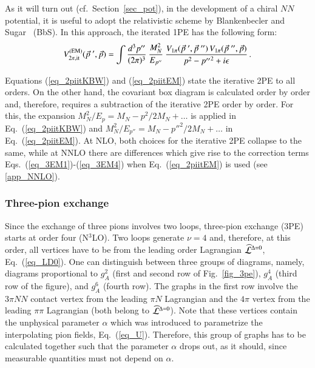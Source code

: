 \documentclass[sort&compress,preprint,3p]{elsarticle}
\begin{document}
As it will turn out (cf.\ Section~\ref{sec_pot}),
in the development of a chiral $NN$ potential,
it is useful
to adopt the relativistic scheme 
by Blankenbecler and Sugar~\cite{BS66} (BbS).
In this approach, the iterated 1PE
has the following form:
\begin{equation}
V_{2\pi, \rm it}^{\rm(EM)} ({\vec p}~',{\vec p})  = 
\int 
\frac{d^3p''}{(2\pi)^3} 
\:
\frac{M_N^2}{E_{p''}} 
\:
\frac{V_{1\pi}({\vec p}~',{\vec p}~'')\,
V_{1\pi}({\vec p}~'',{\vec p})} 
{{ p}^{2}-{p''}^{2}+i\epsilon}
\,.
\label{eq_2piitEM}
\end{equation}

Equations 
(\ref{eq_2piitKBW})
and (\ref{eq_2piitEM})
state the iterative 2PE to all orders.
On the other hand, the covariant box diagram is
calculated order by order and, therefore,
requires a subtraction of the iterative 2PE order
by order.
For this, the expansion
$M^2_N/E_p = M_N - p^2/2M_N + \ldots$ 
is applied in Eq.~(\ref{eq_2piitKBW}) and
$M^2_N/E_{p''} = M_N - {p''}^2/2M_N + \ldots$ 
in Eq.~(\ref{eq_2piitEM}).
At NLO, both choices for the iterative 2PE
collapse to the same, while at NNLO there are 
differences which give rise to the correction terms
Eqs.~(\ref{eq_3EM1})-(\ref{eq_3EM4})
when Eq.~(\ref{eq_2piitEM}) is used (see \ref{app_NNLO}).



\subsubsection{Three-pion exchange}
Since the exchange of three pions involves
two loops,
three-pion exchange (3PE) starts
at order four (N$^3$LO).
Two loops generate $\nu=4$ and, therefore, at this order,
all vertices
have to be from the leading order Lagrangian
$\widehat{\cal L}^{\Delta=0}$, Eq.~(\ref{eq_LD0}).
One can distinguish between three groups of diagrams,
namely, diagrams proportional to
$g_A^2$ (first and second row 
of Fig.~\ref{fig_3pe}), $g_A^4$ (third
row of the figure), 
and $g_A^6$ (fourth row).
The graphs in the first row
involve the $3\pi NN$ contact vertex from
the leading $\pi N$ Lagrangian 
and the $4\pi$ vertex from
the leading $\pi\pi$ Lagrangian
(both belong to $\widehat{\cal L}^{\Delta=0}$).
Note that these vertices contain the unphysical
parameter $\alpha$
which was introduced to parametrize the interpolating pion
fields, Eq.~(\ref{eq_U}). 
Therefore, this group of graphs has to
be calculated together such that the parameter $\alpha$
drops out, as it should, since measurable
quantities must not depend on $\alpha$.
\end{document}
